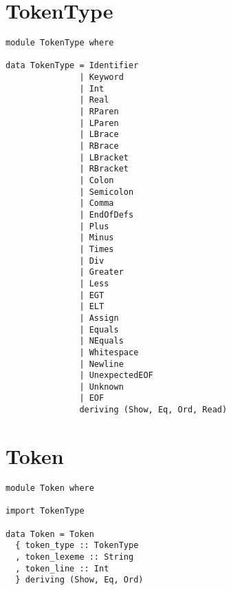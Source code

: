 \documentclass[11pt]{article}
\begin{document}
\section*{TokenType}
\label{sec-4}
\begin{verbatim}
module TokenType where

data TokenType = Identifier
               | Keyword
               | Int
               | Real
               | RParen
               | LParen
               | LBrace
               | RBrace
               | LBracket
               | RBracket
               | Colon
               | Semicolon
               | Comma
               | EndOfDefs
               | Plus
               | Minus
               | Times
               | Div
               | Greater
               | Less
               | EGT
               | ELT
               | Assign
               | Equals
               | NEquals
               | Whitespace
               | Newline
               | UnexpectedEOF
               | Unknown
               | EOF
               deriving (Show, Eq, Ord, Read)
\end{verbatim}

\section*{Token}
\label{sec-5}
\begin{verbatim}
module Token where

import TokenType

data Token = Token
  { token_type :: TokenType
  , token_lexeme :: String
  , token_line :: Int
  } deriving (Show, Eq, Ord)
\end{verbatim}
\end{document}
